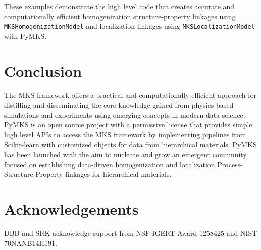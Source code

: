 \documentclass{bmcart}
\begin{document}
    These examples demonstrate the high level code that creates accurate and computationally efficient homogenization structure-property linkages using \texttt{MKSHomogenizationModel} and localization linkages using \texttt{MKSLocalizationModel} with PyMKS.

\section{Conclusion}

The MKS framework offers a practical and computationally efficient approach for distilling and disseminating the core knowledge gained from physics-based simulations and experiments using emerging concepts in modern data science. PyMKS is an open source project with a permissive license that provides simple high level APIs to access the MKS framework by implementing pipelines from Scikit-learn with customized objects for data from hierarchical materials. PyMKS has been launched with the aim to nucleate and grow an emergent community focused on establishing data-driven homogenization and localization Process-Structure-Property linkages for hierarchical materials.





\section*{Acknowledgements}

DBB and SRK acknowledge support from NSF-IGERT Award 1258425 and NIST 70NANB14H191.
\end{document}
